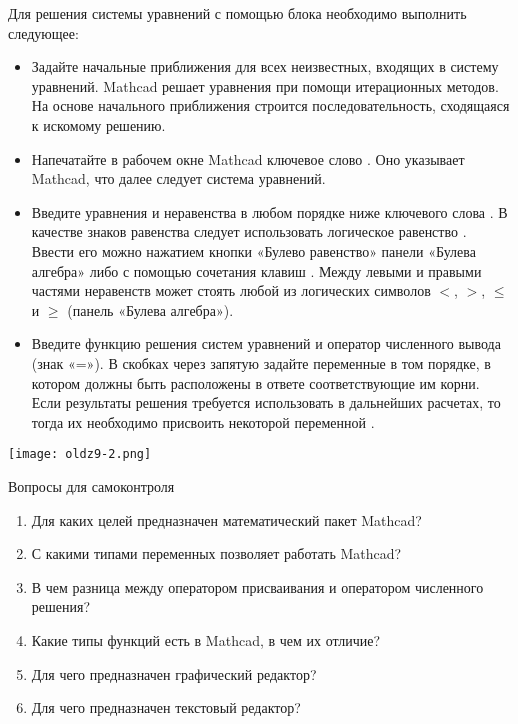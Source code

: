 Для решения системы уравнений с помощью блока  необходимо выполнить следующее:
\begin{itemize}
	\item Задайте начальные приближения для всех неизвестных, входящих в систему уравнений. Mathcad решает уравнения при помощи итерационных методов. На основе начального приближения строится последовательность, сходящаяся к искомому решению. 
	\item Напечатайте в рабочем окне Mathcad ключевое слово . Оно указывает Mathcad, что далее следует система уравнений.
	\item Введите уравнения и неравенства в любом порядке ниже ключевого слова . В качестве знаков равенства следует использовать логическое равенство . Ввести его можно нажатием кнопки «Булево равенство» панели «Булева алгебра» либо с помощью сочетания клавиш \keys{\ctrl+ =}. Между левыми и правыми частями неравенств может стоять любой из логических символов $<$, $>$, $\leqslant$ и $\geqslant$ (панель «Булева алгебра»).
	\item Введите функцию решения систем уравнений  и оператор численного вывода (знак «=»). В скобках через запятую задайте переменные в том порядке, в котором должны быть расположены в ответе соответствующие им корни. Если результаты решения требуется использовать в дальнейших расчетах, то тогда их необходимо присвоить некоторой переменной .
\end{itemize}


\begin{center}
	\texttt{[image: oldz9-2.png]}
\end{center}

Вопросы для самоконтроля
\begin{enumerate}
	\item Для каких целей предназначен математический пакет Mathcad?
	\item С какими типами переменных позволяет работать Mathcad?
	\item В чем разница между оператором присваивания и оператором численного решения?
	\item Какие типы функций есть в Mathcad, в чем их отличие?
	\item  Для чего предназначен графический редактор?
	\item Для чего предназначен текстовый редактор?
\end{enumerate}
